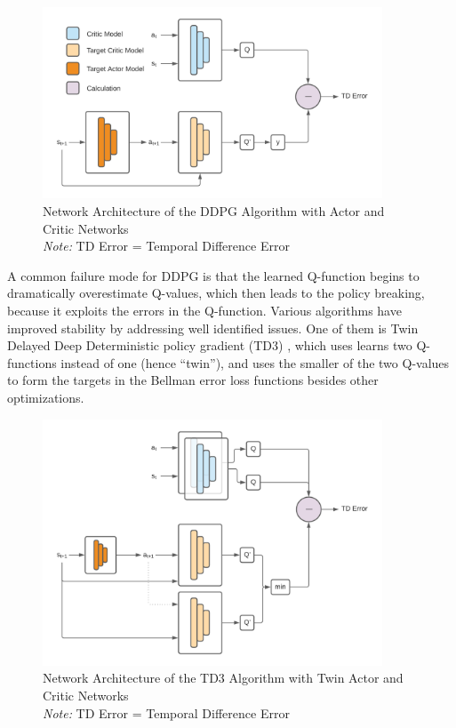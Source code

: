 \documentclass{article}
\begin{document}
\begin{figure}[h]
    \centering
    \includegraphics[width=0.9\textwidth]{DDPG.png}
    \caption{Network Architecture of the DDPG Algorithm with Actor and Critic Networks \\ \emph{Note:} TD Error = Temporal Difference Error}
\end{figure}

A common failure mode for DDPG is that the learned Q-function begins to dramatically overestimate Q-values, which then leads to the policy breaking, because it exploits the errors in the Q-function.  Various algorithms have improved stability by addressing well identified issues. One of them is Twin Delayed Deep Deterministic policy gradient (TD3) \cite{fujimoto_addressing_2018}, which uses learns two Q-functions instead of one (hence “twin”), and uses the smaller of the two Q-values to form the targets in the Bellman error loss functions besides other optimizations.

\begin{figure}[h]
    \centering
    \includegraphics[width=0.9\textwidth]{TD3.png}
    \caption{Network Architecture of the TD3 Algorithm with Twin Actor and Critic Networks \\ \emph{Note:} TD Error = Temporal Difference Error}
\end{figure}
\end{document}
